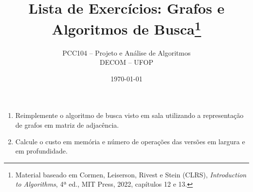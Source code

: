 \documentclass[10pt,a4paper]{extarticle}
\title{Lista de Exercícios: Grafos e Algoritmos de Busca\footnote{Material baseado em Cormen, Leiserson, Rivest e Stein (CLRS), \emph{Introduction to Algorithms}, 4ª ed., MIT Press, 2022, capítulos 12 e 13.}}
\author{PCC104 -- Projeto e Análise de Algoritmos \\ DECOM -- UFOP}
\date{\today}
\begin{document}
\maketitle

\begin{enumerate}
  \item Reimplemente o algoritmo de busca visto em sala utilizando a representação de grafos em matriz de adjacência. 
  \item Calcule o custo em memória e número de operações das versões em largura e em profundidade.
\end{enumerate}



\end{document}
